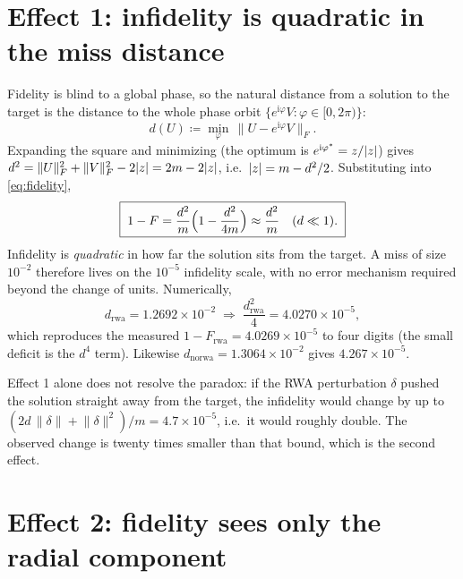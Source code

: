 \documentclass[11pt]{article}
\newcommand{\ii}{\mathrm{i}}
\newcommand{\norm}[1]{\lVert #1 \rVert}
\DeclarePairedDelimiter{\abs}{\lvert}{\rvert}
\begin{document}
\section{Effect 1: infidelity is quadratic in the miss distance}

Fidelity is blind to a global phase, so the natural distance from a solution to
the target is the distance to the whole phase orbit
$\{e^{\ii\varphi} V : \varphi \in [0, 2\pi)\}$:
\begin{equation}
    d(U) \coloneqq \min_{\varphi} \,\norm{U - e^{\ii\varphi} V}_F .
\end{equation}
Expanding the square and minimizing (the optimum is
$e^{\ii\varphi^*} = z/\abs{z}$) gives
$d^2 = \norm{U}_F^2 + \norm{V}_F^2 - 2\abs{z} = 2m - 2\abs{z}$, i.e.\
$\abs{z} = m - d^2/2$.  Substituting into \eqref{eq:fidelity},
\begin{equation} \label{eq:quadratic}
    \boxed{\;
    1 - F = \frac{d^2}{m}\Bigl(1 - \frac{d^2}{4m}\Bigr)
          \approx \frac{d^2}{m}
    \quad (d \ll 1). \;}
\end{equation}
Infidelity is \emph{quadratic} in how far the solution sits from the target.
A miss of size $10^{-2}$ therefore lives on the $10^{-5}$ infidelity scale,
with no error mechanism required beyond the change of units.  Numerically,
\begin{equation}
    d_{\mathrm{rwa}} = 1.2692\times10^{-2}
    \;\Rightarrow\;
    \frac{d_{\mathrm{rwa}}^2}{4} = 4.0270\times10^{-5},
\end{equation}
which reproduces the measured $1 - F_{\mathrm{rwa}} = 4.0269\times10^{-5}$ to
four digits (the small deficit is the $d^4$ term).  Likewise
$d_{\mathrm{norwa}} = 1.3064\times10^{-2}$ gives $4.267\times10^{-5}$.

Effect 1 alone does not resolve the paradox: if the RWA perturbation $\delta$
pushed the solution straight away from the target, the infidelity would change
by up to $(2 d\,\norm{\delta} + \norm{\delta}^2)/m = 4.7\times10^{-5}$, i.e.\ it
would roughly double.  The observed change is twenty times smaller than that
bound, which is the second effect.

\section{Effect 2: fidelity sees only the radial component}
\end{document}
